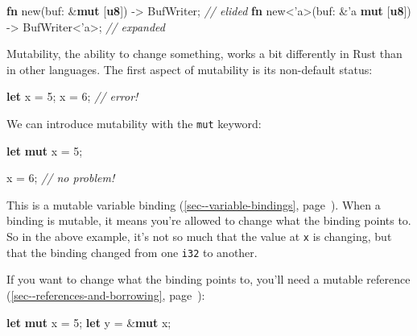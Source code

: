 \documentclass[a4paper,]{book}
\renewcommand*{\hyperref}[2][\ar]{%
  \def\ar{#2}%
  #2 (\autoref{#1}, page~\pageref{#1})}
\newenvironment{Shaded}{\begin{snugshade}}{\end{snugshade}}
\newcommand{\KeywordTok}[1]{\textcolor[rgb]{0.13,0.29,0.53}{\textbf{{#1}}}}
\newcommand{\DecValTok}[1]{\textcolor[rgb]{0.00,0.00,0.81}{{#1}}}
\newcommand{\CommentTok}[1]{\textcolor[rgb]{0.56,0.35,0.01}{\textit{{#1}}}}
\newcommand{\OtherTok}[1]{\textcolor[rgb]{0.56,0.35,0.01}{{#1}}}
\newcommand{\NormalTok}[1]{{#1}}
\begin{document}
\begin{Shaded}
\begin{Highlighting}[]
\KeywordTok{fn} \NormalTok{new(buf: &}\KeywordTok{mut} \NormalTok{[}\KeywordTok{u8}\NormalTok{]) -> BufWriter; }\CommentTok{// elided}
\KeywordTok{fn} \NormalTok{new<}\OtherTok{'a}\NormalTok{>(buf: &}\OtherTok{'a} \KeywordTok{mut} \NormalTok{[}\KeywordTok{u8}\NormalTok{]) -> BufWriter<}\OtherTok{'a}\NormalTok{>; }\CommentTok{// expanded}
\end{Highlighting}
\end{Shaded}


Mutability, the ability to change something, works a bit differently in
Rust than in other languages. The first aspect of mutability is its
non-default status:

\begin{Shaded}
\begin{Highlighting}[]
\KeywordTok{let} \NormalTok{x = }\DecValTok{5}\NormalTok{;}
\NormalTok{x = }\DecValTok{6}\NormalTok{; }\CommentTok{// error!}
\end{Highlighting}
\end{Shaded}

We can introduce mutability with the \texttt{mut} keyword:

\begin{Shaded}
\begin{Highlighting}[]
\KeywordTok{let} \KeywordTok{mut} \NormalTok{x = }\DecValTok{5}\NormalTok{;}

\NormalTok{x = }\DecValTok{6}\NormalTok{; }\CommentTok{// no problem!}
\end{Highlighting}
\end{Shaded}

This is a mutable \hyperref[sec--variable-bindings]{variable binding}.
When a binding is mutable, it means you're allowed to change what the
binding points to. So in the above example, it's not so much that the
value at \texttt{x} is changing, but that the binding changed from one
\texttt{i32} to another.

If you want to change what the binding points to, you'll need a
\hyperref[sec--references-and-borrowing]{mutable reference}:

\begin{Shaded}
\begin{Highlighting}[]
\KeywordTok{let} \KeywordTok{mut} \NormalTok{x = }\DecValTok{5}\NormalTok{;}
\KeywordTok{let} \NormalTok{y = &}\KeywordTok{mut} \NormalTok{x;}
\end{Highlighting}
\end{Shaded}
\end{document}

